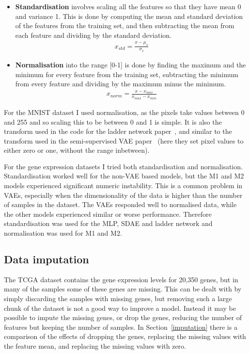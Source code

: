 \begin{itemize}
  \item \textbf{Standardisation} involves scaling all the features so that they have mean 0 and variance 1. This is done by computing the mean 
          and standard deviation of the features from the training set, and then subtracting the mean from each feature and dividing by the
          standard deviation.
          \begin{align}
            x_{std} = \frac{x - \mu_{x}}{\sigma_{x}}
          \end{align}
  \item \textbf{Normalisation} into the range [0-1] is done by finding the maximum and the minimum for every feature from the training set,
          subtracting the minimum from every feature and dividing by the maximum minus the minimum.
          \begin{align}
            x_{norm} = \frac{x - x_{max}}{x_{max} - x_{min}}
          \end{align}
\end{itemize}

For the MNIST dataset I used normalisation, as the pixels take values between 0 and 255 and so scaling this to be between 0 and 1 is 
simple. It is also the transform used in the code for the ladder network paper~\cite{DBLP:journals/corr/RasmusVHBR15}, 
and similar to the transform used in the semi-supervised VAE paper~\cite{DBLP:journals/corr/KingmaRMW14} (here they set pixel values to 
either zero or one, without the range inbetween).

For the gene expression datasets I tried both standardisation and normalisation. Standardisation worked well for the non-VAE based models,
but the M1 and M2 models experienced significant numeric instability. This is a common problem in
VAEs, especially when the dimensionality of the data is higher than the number of samples in the dataset. The VAEs responded well to normalised
data, while the other models experienced similar or worse performance. Therefore standardisation was used for the MLP, SDAE and ladder 
network and normalisation was used for M1 and M2.

\subsection{Data imputation} \label{imput}
The TCGA dataset contains the gene expression levels for 20,350 genes, but in many of the samples some of these genes are missing.
This can be dealt with by simply discarding the samples with missing genes, but removing such
a large chunk of the dataset is not a good way to improve a model. Instead it may be possible to impute the missing genes, or drop the 
genes, reducing the number of features but keeping the number of samples. In Section~\ref{imputation} there is a comparison 
of the effects of dropping the genes, replacing the missing values with the feature mean, and replacing the missing values with zero.

